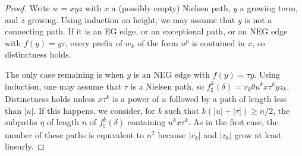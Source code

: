 \documentclass[10pt,a4paper]{amsart}
\begin{document}
\begin{proof}
 Write $w=xyz$ with $x$ a (possibly empty)  
   Nielsen path, $y$ a  growing term, and $z$ growing. Using induction on height, we may assume that $y$ is not a connecting path.  
    If it is an EG edge, or an exceptional path, or an   NEG edge with $f(y)=y\tau$, 
     every prefix of $w_k$ of the form $u^p$ is contained in $x$, 
 so distinctness holds. 
 

 The only case remaining is when $y$ is an NEG edge with $f(y)=\tau y$. Using induction, one may assume that  $\tau$ is a Nielsen path, so $f^k_\sharp(\delta)=v_k\theta u^{ k} x\tau^kyz_k$. Distinctness holds 
 unless $x\tau^k$ is a power of $u$ followed by a path of length less than $ | u | $. If this happens, we consider, for $k$ such that $k (| u |+| \tau | )\ge n/2$, the subpaths $\eta$ of length $n$ of $f^k_\sharp(\delta)$ containing $u^{ k} x\tau^k$. 
  As in the first case,  
 the number of these paths is equivalent to $n^2$ because $| v_k |$ and $|z_k|$   grow at least  linearly.
\end{proof}
\end{document}
